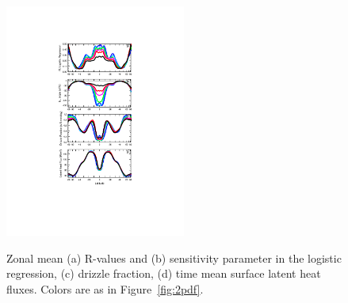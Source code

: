 \begin{figure}[t]
\begin{center}
\noindent\includegraphics[width=14pc,angle=0]{figs/temp_zonal_4reg_dwn.pdf}\\
\end{center}
\caption{Zonal mean (a) R-values and (b) sensitivity parameter in the logistic regression, (c) drizzle fraction, (d) time mean surface latent heat fluxes. Colors are as in Figure~\ref{fig:2pdf}.}
\label{fig:4reg}
\end{figure}

